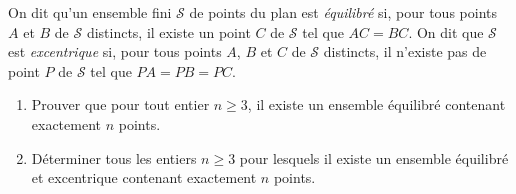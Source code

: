 On dit qu'un ensemble fini $\mathcal{S}$ de points du plan est \emph{équilibré} si, pour tous points $A$ et $B$
de $\mathcal{S}$ distincts, il existe un point $C$ de $\mathcal{S}$ tel que $AC = BC$. On dit que $\mathcal{S}$
est \emph{excentrique} si, pour tous points $A$, $B$ et $C$ de $\mathcal{S}$ distincts, il n'existe pas de
point $P$ de $\mathcal{S}$ tel que $PA = PB = PC$.
\begin{enumerate}
  \item[(a)] Prouver que pour tout entier $n \geqslant 3$, il existe un ensemble équilibré contenant exactement
  $n$ points.
  \item[(b)] Déterminer tous les entiers $n \geqslant 3$ pour lesquels il existe un ensemble équilibré et
  excentrique contenant exactement $n$ points.
\end{enumerate}
